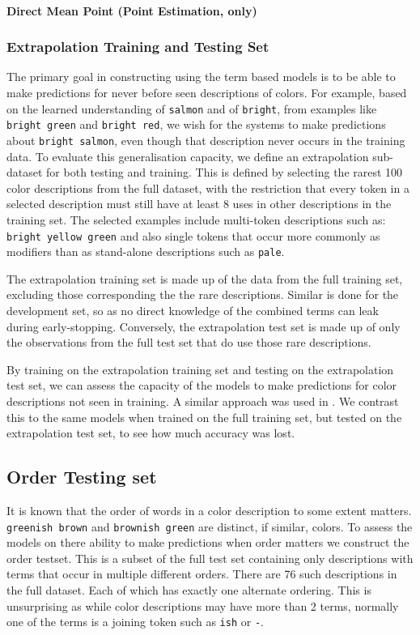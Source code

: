 \documentclass[11pt,a4paper]{article}
\newcommand{\textcite}{\citet}
\newcommand{\natlang}[1]{\texttt{#1}}
\begin{document}
\paragraph{Direct Mean Point (Point Estimation, only)}


\subsubsection{Extrapolation Training and Testing Set}
The primary goal in constructing using the term based models is to be able to make predictions for never before seen descriptions of colors.
For example, based on the learned understanding of \texttt{salmon} and of \texttt{bright}, from examples like \texttt{bright green} and \texttt{bright red}, we wish for the systems to make predictions about \texttt{bright salmon}, even though that description never occurs in the training data.
%
To evaluate this generalisation capacity, we define an extrapolation sub-dataset for both testing and training.
This is defined by selecting the rarest 100 color descriptions from the full dataset,
with the restriction that every token in a selected description must still have at least 8 uses in other descriptions in the training set.
The selected examples include multi-token descriptions such as: \texttt{bright yellow green} and also single tokens that occur more commonly as modifiers than as stand-alone descriptions such as \texttt{pale}.

The extrapolation training set is made up of the data from the full training set, excluding those  corresponding the the rare descriptions.
Similar is done for the development set, so as no direct knowledge of the combined terms can leak during early-stopping.
Conversely, the extrapolation test set is made up of only the observations from the full test set that do use those rare descriptions.


By training on the extrapolation training set and testing on the extrapolation test set, we can assess the capacity of the models to make predictions for color descriptions not seen in training.
A similar approach was used in \textcite{DBLP:journals/corr/AtzmonBKGC16}.
We contrast this to the same models when trained on the full training set, but tested on the extrapolation test set, to see how much accuracy was lost.


\subsection{Order Testing set}
It is known that the order of words in a color description to some extent matters.
\natlang{greenish brown} and \natlang{brownish green} are distinct, if similar, colors.
To assess the models on there ability to make predictions when order matters we construct the order testset.
This is a subset of the full test set containing only descriptions with terms that occur in multiple different orders.
There are 76 such descriptions in the full dataset.
Each of which has exactly one alternate ordering.
This is unsurprising as while color descriptions may have more than 2 terms, normally one of the terms is a joining token such as \natlang{ish} or \natlang{-}.
\end{document}
